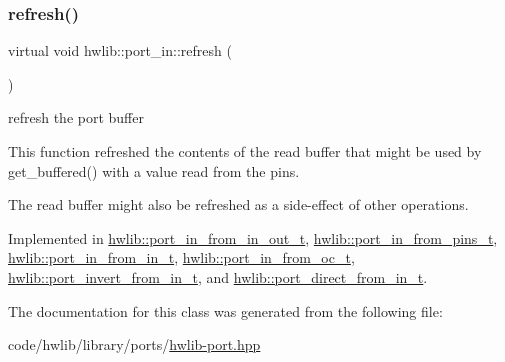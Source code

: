 \mbox{\label{classhwlib_1_1port__in_a5d409eee35b766c844f7229fbe010545}} 
\subsubsection{\texorpdfstring{refresh()}{refresh()}}
{\footnotesize\ttfamily virtual void hwlib\+::port\+\_\+in\+::refresh (\begin{DoxyParamCaption}{ }\end{DoxyParamCaption})\hspace{0.3cm}{\ttfamily [pure virtual]}}





refresh the port buffer

This function refreshed the contents of the read buffer that might be used by get\+\_\+buffered() with a value read from the pins.

The read buffer might also be refreshed as a side-\/effect of other operations. 

Implemented in \hyperlink{classhwlib_1_1port__in__from__in__out__t_a0f499254dadfe9f8306b03b7b7a90d9f}{hwlib\+::port\+\_\+in\+\_\+from\+\_\+in\+\_\+out\+\_\+t}, \hyperlink{classhwlib_1_1port__in__from__pins__t_a07ed96c246cae9499ed61a20916fe643}{hwlib\+::port\+\_\+in\+\_\+from\+\_\+pins\+\_\+t}, \hyperlink{classhwlib_1_1port__in__from__in__t_a44f91dea24d3a938b28a35c05249fcd9}{hwlib\+::port\+\_\+in\+\_\+from\+\_\+in\+\_\+t}, \hyperlink{classhwlib_1_1port__in__from__oc__t_a2752b7d3a9e676033ad421b3ca5e903b}{hwlib\+::port\+\_\+in\+\_\+from\+\_\+oc\+\_\+t}, \hyperlink{classhwlib_1_1port__invert__from__in__t_a7d1b6da3c97d9d3edbe0c10697f1ceca}{hwlib\+::port\+\_\+invert\+\_\+from\+\_\+in\+\_\+t}, and \hyperlink{classhwlib_1_1port__direct__from__in__t_ab6b6bdd7d83f3ef606960950e4c281c0}{hwlib\+::port\+\_\+direct\+\_\+from\+\_\+in\+\_\+t}.



The documentation for this class was generated from the following file\+:\begin{DoxyCompactItemize}
\item 
code/hwlib/library/ports/\hyperlink{hwlib-port_8hpp}{hwlib-\/port.\+hpp}\end{DoxyCompactItemize}
